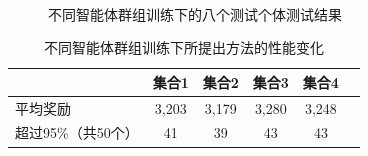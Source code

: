 \begin{figure}[htbp]
  \quad\quad
  \\
  \quad\quad
  \caption{不同智能体群组训练下的八个测试个体测试结果}
  \label{size}
\end{figure}

\begin{table}[htbp]
\centering
\caption{不同智能体群组训练下所提出方法的性能变化}
\label{cluster_agents}
\renewcommand{\arraystretch}{1.2}
\setlength{\tabcolsep}{6mm}
\small

\begin{tabular}{lccccc}
\toprule
               & 集合1   & 集合2    & 集合3    & 集合4        \\ 
\midrule
平均奖励 & 3,203 & 3,179 & 3,280 & 3,248           \\
超过95\%（共50个）    & 41        & 39         & 43         & 43         \\ 
\bottomrule
\end{tabular}
\end{table}

